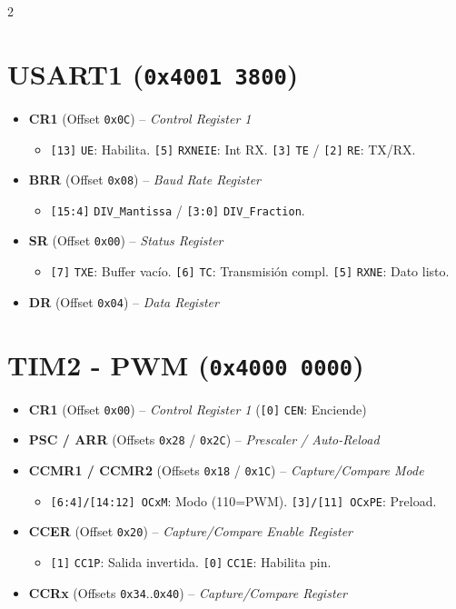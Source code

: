 \documentclass[10pt,a4paper]{article}
\begin{document}
\begin{multicols*}{2}
\section*{USART1 (\texttt{0x4001 3800})}
\begin{itemize}
    \item \textbf{CR1} (Offset \texttt{0x0C}) -- \textit{Control Register 1}
    \begin{itemize}
        \item \texttt{[13]} \texttt{UE}: Habilita. \texttt{[5]} \texttt{RXNEIE}: Int RX. \texttt{[3]} \texttt{TE} / \texttt{[2]} \texttt{RE}: TX/RX.
    \end{itemize}
    \item \textbf{BRR} (Offset \texttt{0x08}) -- \textit{Baud Rate Register} 
    \begin{itemize}
        \item \texttt{[15:4]} \texttt{DIV\_Mantissa} / \texttt{[3:0]} \texttt{DIV\_Fraction}.
    \end{itemize}
    \item \textbf{SR} (Offset \texttt{0x00}) -- \textit{Status Register}
    \begin{itemize}
        \item \texttt{[7]} \texttt{TXE}: Buffer vacío. \texttt{[6]} \texttt{TC}: Transmisión compl. \texttt{[5]} \texttt{RXNE}: Dato listo.
    \end{itemize}
    \item \textbf{DR} (Offset \texttt{0x04}) -- \textit{Data Register}
\end{itemize}

\section*{TIM2 - PWM (\texttt{0x4000 0000})}
\begin{itemize}
    \item \textbf{CR1} (Offset \texttt{0x00}) -- \textit{Control Register 1} (\texttt{[0]} \texttt{CEN}: Enciende)
    \item \textbf{PSC / ARR} (Offsets \texttt{0x28} / \texttt{0x2C}) -- \textit{Prescaler / Auto-Reload}
    \item \textbf{CCMR1 / CCMR2} (Offsets \texttt{0x18} / \texttt{0x1C}) -- \textit{Capture/Compare Mode}
    \begin{itemize}
        \item \texttt{[6:4]/[14:12] OCxM}: Modo (110=PWM). \texttt{[3]/[11] OCxPE}: Preload.
    \end{itemize}
    \item \textbf{CCER} (Offset \texttt{0x20}) -- \textit{Capture/Compare Enable Register}
    \begin{itemize}
        \item \texttt{[1]} \texttt{CC1P}: Salida invertida. \texttt{[0]} \texttt{CC1E}: Habilita pin.
    \end{itemize}
    \item \textbf{CCRx} (Offsets \texttt{0x34}..\texttt{0x40}) -- \textit{Capture/Compare Register}
\end{itemize}

\end{multicols*}
\end{document}
